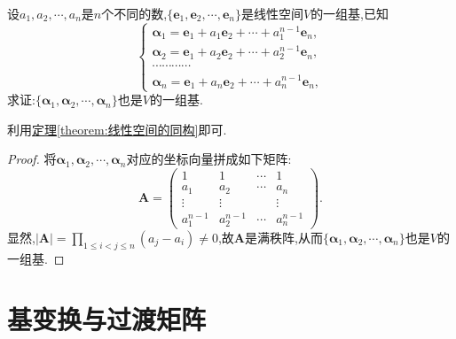 \documentclass[lang=cn,newtx,10pt,scheme=chinese]{elegantbook}
\begin{document}
\begin{example}\label{example:3.110.1}
设\(a_1,a_2,\cdots,a_n\)是\(n\)个不同的数,\(\{\boldsymbol{e}_1,\boldsymbol{e}_2,\cdots,\boldsymbol{e}_n\}\)是线性空间\(V\)的一组基,已知
\[
\begin{cases}
\boldsymbol{\alpha}_1=\boldsymbol{e}_1 + a_1\boldsymbol{e}_2+\cdots + a_1^{n - 1}\boldsymbol{e}_n,\\
\boldsymbol{\alpha}_2=\boldsymbol{e}_1 + a_2\boldsymbol{e}_2+\cdots + a_2^{n - 1}\boldsymbol{e}_n,\\
\cdots\cdots\cdots\cdots\\
\boldsymbol{\alpha}_n=\boldsymbol{e}_1 + a_n\boldsymbol{e}_2+\cdots + a_n^{n - 1}\boldsymbol{e}_n,
\end{cases}
\]
求证:\(\{\boldsymbol{\alpha}_1,\boldsymbol{\alpha}_2,\cdots,\boldsymbol{\alpha}_n\}\)也是\(V\)的一组基.
\end{example}
\begin{note}
利用\hyperref[theorem:线性空间的同构]{定理\ref{theorem:线性空间的同构}}即可.
\end{note}
\begin{proof}
将\(\boldsymbol{\alpha}_1,\boldsymbol{\alpha}_2,\cdots,\boldsymbol{\alpha}_n\)对应的坐标向量拼成如下矩阵:
\[
\boldsymbol{A}=\begin{pmatrix}
1&1&\cdots&1\\
a_1&a_2&\cdots&a_n\\
\vdots&\vdots&&\vdots\\
a_1^{n - 1}&a_2^{n - 1}&\cdots&a_n^{n - 1}
\end{pmatrix}.
\]
显然,\(|\boldsymbol{A}|=\prod_{1\leq i<j\leq n}(a_j - a_i)\neq0\),故\(\boldsymbol{A}\)是满秩阵,从而\(\{\boldsymbol{\alpha}_1,\boldsymbol{\alpha}_2,\cdots,\boldsymbol{\alpha}_n\}\)也是\(V\)的一组基. 
\end{proof}

\section{基变换与过渡矩阵}
\end{document}
